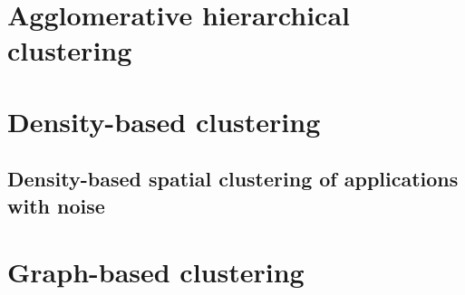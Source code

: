 \section{Agglomerative hierarchical clustering}
\section{Density-based clustering}
\subsection{Density-based spatial clustering of applications with noise}
\section{Graph-based clustering}